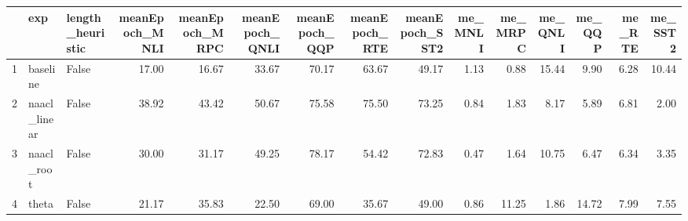\begin{table}[ht]
\centering
\begin{tabular}{rllrrrrrrrrrrrr}
  \hline
 & exp & length\_heuristic & meanEpoch\_MNLI & meanEpoch\_MRPC & meanEpoch\_QNLI & meanEpoch\_QQP & meanEpoch\_RTE & meanEpoch\_SST2 & me\_MNLI & me\_MRPC & me\_QNLI & me\_QQP & me\_RTE & me\_SST2 \\ 
  \hline
1 & baseline & False & 17.00 & 16.67 & 33.67 & 70.17 & 63.67 & 49.17 & 1.13 & 0.88 & 15.44 & 9.90 & 6.28 & 10.44 \\ 
  2 & naacl\_linear & False & 38.92 & 43.42 & 50.67 & 75.58 & 75.50 & 73.25 & 0.84 & 1.83 & 8.17 & 5.89 & 6.81 & 2.00 \\ 
  3 & naacl\_root & False & 30.00 & 31.17 & 49.25 & 78.17 & 54.42 & 72.83 & 0.47 & 1.64 & 10.75 & 6.47 & 6.34 & 3.35 \\ 
  4 & theta & False & 21.17 & 35.83 & 22.50 & 69.00 & 35.67 & 49.00 & 0.86 & 11.25 & 1.86 & 14.72 & 7.99 & 7.55 \\ 
   \hline
\end{tabular}
\end{table}
